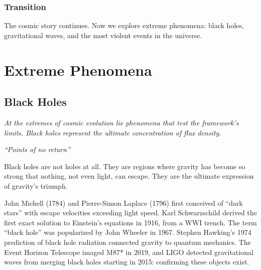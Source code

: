 \documentclass[
  11pt,
  letterpaper,
  twoside,
  openright]{book}
\begin{document}
\section{Transition}\label{transition-32}

The cosmic story continues. Now we explore extreme phenomena: black
holes, gravitational waves, and the most violent events in the universe.

\part{Extreme Phenomena}

\chapter{Black Holes}\label{sec-black-holes}

\emph{At the extremes of cosmic evolution lie phenomena that test the
framework's limits. Black holes represent the ultimate concentration of
flux density.}

\emph{``Points of no return''}

\begin{tcolorbox}[enhanced jigsaw, leftrule=.75mm, title=\textcolor{quarto-callout-note-color}{\faInfo}\hspace{0.5em}{Key Revelation}, bottomrule=.15mm, opacityback=0, coltitle=black, arc=.35mm, colframe=quarto-callout-note-color-frame, colbacktitle=quarto-callout-note-color!10!white, colback=white, titlerule=0mm, breakable, bottomtitle=1mm, toptitle=1mm, rightrule=.15mm, toprule=.15mm, left=2mm, opacitybacktitle=0.6]

Black holes are not holes at all. They are regions where gravity has
become so strong that nothing, not even light, can escape. They are the
ultimate expression of gravity's triumph.

\end{tcolorbox}

\begin{tcolorbox}[enhanced jigsaw, leftrule=.75mm, title=\textcolor{quarto-callout-note-color}{\faInfo}\hspace{0.5em}{Historical Context}, bottomrule=.15mm, opacityback=0, coltitle=black, arc=.35mm, colframe=quarto-callout-note-color-frame, colbacktitle=quarto-callout-note-color!10!white, colback=white, titlerule=0mm, breakable, bottomtitle=1mm, toptitle=1mm, rightrule=.15mm, toprule=.15mm, left=2mm, opacitybacktitle=0.6]

John Michell (1784) and Pierre-Simon Laplace (1796) first conceived of
``dark stars'' with escape velocities exceeding light speed. Karl
Schwarzschild derived the first exact solution to Einstein's equations
in 1916, from a WWI trench. The term ``black hole'' was popularized by
John Wheeler in 1967. Stephen Hawking's 1974 prediction of black hole
radiation connected gravity to quantum mechanics. The Event Horizon
Telescope imaged M87* in 2019, and LIGO detected gravitational waves
from merging black holes starting in 2015: confirming these objects
exist.

\end{tcolorbox}
\end{document}
